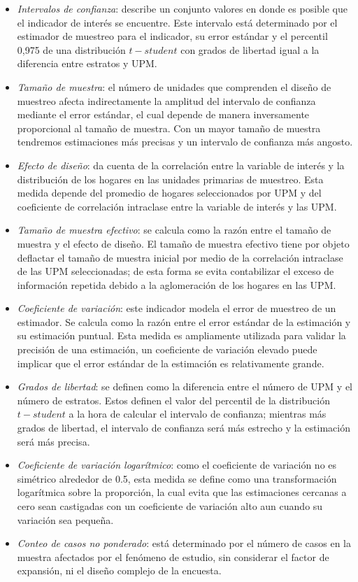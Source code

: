 \documentclass[
  12pt,
  spanish,
]{book}
\providecommand{\tightlist}{%
  \setlength{\itemsep}{0pt}\setlength{\parskip}{0pt}}
\begin{document}
\begin{itemize}
\tightlist
\item
  \emph{Intervalos de confianza}: describe un conjunto valores en donde es posible que el indicador de interés se encuentre. Este intervalo está determinado por el estimador de muestreo para el indicador, su error estándar y el percentil 0,975 de una distribución \(t-student\) con grados de libertad igual a la diferencia entre estratos y UPM.
\item
  \emph{Tamaño de muestra}: el número de unidades que comprenden el diseño de muestreo afecta indirectamente la amplitud del intervalo de confianza mediante el error estándar, el cual depende de manera inversamente proporcional al tamaño de muestra. Con un mayor tamaño de muestra tendremos estimaciones más precisas y un intervalo de confianza más angosto.
\item
  \emph{Efecto de diseño}: da cuenta de la correlación entre la variable de interés y la distribución de los hogares en las unidades primarias de muestreo. Esta medida depende del promedio de hogares seleccionados por UPM y del coeficiente de correlación intraclase entre la variable de interés y las UPM.
\item
  \emph{Tamaño de muestra efectivo}: se calcula como la razón entre el tamaño de muestra y el efecto de diseño. El tamaño de muestra efectivo tiene por objeto deflactar el tamaño de muestra inicial por medio de la correlación intraclase de las UPM seleccionadas; de esta forma se evita contabilizar el exceso de información repetida debido a la aglomeración de los hogares en las UPM.
\item
  \emph{Coeficiente de variación}: este indicador modela el error de muestreo de un estimador. Se calcula como la razón entre el error estándar de la estimación y su estimación puntual. Esta medida es ampliamente utilizada para validar la precisión de una estimación, un coeficiente de variación elevado puede implicar que el error estándar de la estimación es relativamente grande.
\item
  \emph{Grados de libertad}: se definen como la diferencia entre el número de UPM y el número de estratos. Estos definen el valor del percentil de la distribución \(t-student\) a la hora de calcular el intervalo de confianza; mientras más grados de libertad, el intervalo de confianza será más estrecho y la estimación será más precisa.
\item
  \emph{Coeficiente de variación logarítmico}: como el coeficiente de variación no es simétrico alrededor de 0.5, esta medida se define como una transformación logarítmica sobre la proporción, la cual evita que las estimaciones cercanas a cero sean castigadas con un coeficiente de variación alto aun cuando su variación sea pequeña.
\item
  \emph{Conteo de casos no ponderado}: está determinado por el número de casos en la muestra afectados por el fenómeno de estudio, sin considerar el factor de expansión, ni el diseño complejo de la encuesta.
\end{itemize}
\end{document}
